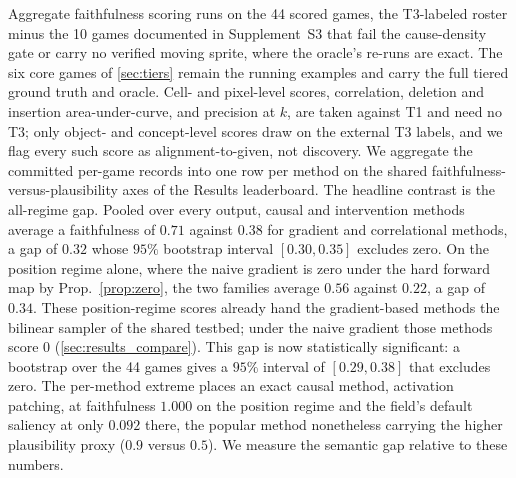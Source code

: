 Aggregate faithfulness scoring runs on the 44 scored games, the T3-labeled roster minus
the 10 games documented in Supplement~S3 that fail the cause-density gate or carry no verified moving sprite, where the oracle's re-runs
are exact. The six core games of \Sectionname\ref{sec:tiers} remain the running examples
and carry the full tiered ground truth and oracle. Cell- and pixel-level scores,
correlation, deletion and insertion area-under-curve, and precision at $k$, are taken
against T1 and need no T3; only object- and concept-level scores draw on the external T3
labels, and we flag every such score as alignment-to-given, not discovery. We aggregate the
committed per-game records into one row per method on the shared
faithfulness-versus-plausibility axes of the Results leaderboard.
The headline contrast is the all-regime gap. Pooled over every output, causal and
intervention methods average a faithfulness of $0.71$ against $0.38$ for gradient and
correlational methods, a gap of $0.32$ whose $95\%$ bootstrap interval $[0.30,0.35]$
excludes zero. On the position
regime alone, where the naive gradient is zero under the hard forward map by
Prop.~\ref{prop:zero}, the two families average $0.56$ against $0.22$, a gap of $0.34$. These
position-regime scores already hand the gradient-based methods the bilinear sampler of the
shared testbed; under the naive gradient those methods score $0$
(\Sectionname\ref{sec:results_compare}).
This gap is now statistically significant: a bootstrap over the 44 games gives a $95\%$
interval of $[0.29,0.38]$ that excludes zero. The per-method extreme places an
exact causal method, activation patching, at faithfulness $1.000$ on the position regime and
the field's default saliency at only $0.092$ there, the popular method
nonetheless carrying the higher plausibility proxy ($0.9$ versus $0.5$). We measure the
semantic gap relative to these numbers.

